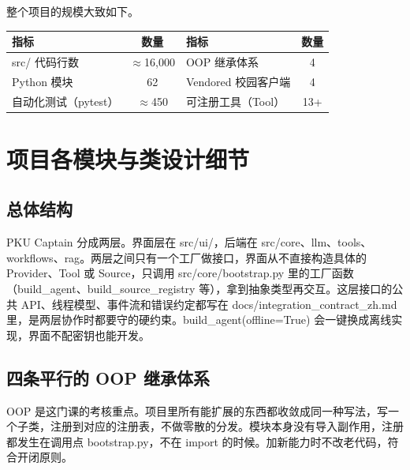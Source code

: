 \documentclass[UTF8,a4paper,11pt,fontset=none]{ctexart}
\newcommand{\code}[1]{{\ttfamily\small #1}}
\begin{document}
整个项目的规模大致如下。

\begin{center}
\small
\begin{tabular}{@{}l c l c@{}}
\toprule
\rowcolor{seambg}指标 & 数量 & 指标 & 数量 \\
\midrule
\code{src/} 代码行数 & $\approx$16{,}000 & OOP 继承体系 & 4 \\
Python 模块 & 62 & Vendored 校园客户端 & 4 \\
自动化测试（pytest） & $\approx$450 & 可注册工具（Tool） & 13+ \\
\bottomrule
\end{tabular}
\end{center}

\section{项目各模块与类设计细节}

\subsection{总体结构}

PKU Captain 分成两层。界面层在 \code{src/ui/}，后端在 \code{src/core}、\code{llm}、\code{tools}、\code{workflows}、\code{rag}。两层之间只有一个工厂做接口，界面从不直接构造具体的 Provider、Tool 或 Source，只调用 \code{src/core/bootstrap.py} 里的工厂函数（\code{build\_agent}、\code{build\_source\_registry} 等），拿到抽象类型再交互。这层接口的公共 API、线程模型、事件流和错误约定都写在 \code{docs/integration\_contract\_zh.md} 里，是两层协作时都要守的硬约束。\code{build\_agent(offline=True)} 会一键换成离线实现，界面不配密钥也能开发。

\subsection{四条平行的 OOP 继承体系}

OOP 是这门课的考核重点。项目里所有能扩展的东西都收敛成同一种写法，写一个子类，注册到对应的注册表，不做零散的分发。模块本身没有导入副作用，注册都发生在调用点 \code{bootstrap.py}，不在 import 的时候。加新能力时不改老代码，符合开闭原则。
\end{document}
